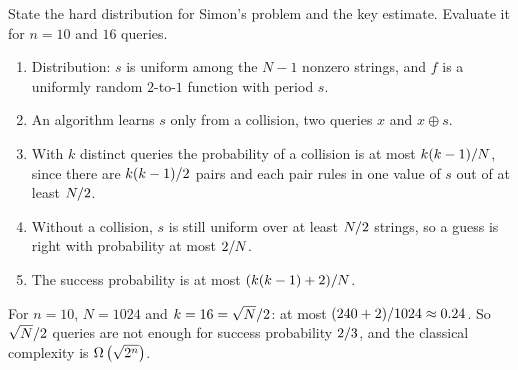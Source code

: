 \begin{exercisebox}
\begin{pproblem}\label{pp:simon-lb}
    State the hard distribution for Simon's problem and the key estimate. Evaluate it for $n = 10$
    and $16$ queries.
\end{pproblem}
\tcblower
\begin{wsolution}
    \leavevmode
    \begin{enumerate}
        \item Distribution: $s$ is uniform among the $N - 1$ nonzero strings, and $f$ is a uniformly
              random $2$-to-$1$ function with period $s$.
        \item An algorithm learns $s$ only from a collision, two queries $x$ and $x \oplus s$.
        \item With $k$ distinct queries the probability of a collision is at most
              $k(k-1)/N$, since there are $k(k-1)/2$ pairs and each pair rules in
              one value of $s$ out of at least $N/2$.
        \item Without a collision, $s$ is still uniform over at least $N/2$ strings, so a
              guess is right with probability at most $2/N$.
        \item The success probability is at most $(k(k-1) + 2)/N$.
    \end{enumerate}
    For $n = 10$, $N = 1024$ and $k = 16 = \sqrt{N}/2$: at most
    $(240 + 2)/1024 \approx 0.24$. So $\sqrt{N}/2$ queries are not enough for
    success probability $2/3$, and the classical complexity is $\Omega\left(\sqrt{2^n}\right)$.
\end{wsolution}
\end{exercisebox}
